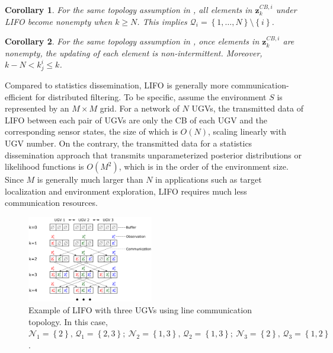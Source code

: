 \documentclass[journal]{IEEEtranTIE}
\newtheorem{cor}{\bfseries Corollary}
\theoremstyle{remark}
\begin{document}
	\begin{cor}\label{cor1}
		For the same topology assumption in , all elements in $\mathbf{z}^{CB,i}_k$ under LIFO become nonempty when $k\geq N$. 
		This implies $\mathcal{Q}_i = \left\lbrace1,\dots,N \right\rbrace \setminus \left\lbrace i\right\rbrace $.	
	\end{cor}
	
	\begin{cor}\label{cor2}
		For the same topology assumption in , once elements in $\mathbf{z}^{CB,i}_k$ are nonempty, the updating of each element is non-intermittent. Moreover, $k-N<k^i_j\leq k$.
	\end{cor}
	\medskip
	Compared to statistics dissemination, LIFO is generally more communication-efficient for distributed filtering. 
	To be specific, assume the environment $S$ is represented by an $M\times M$ grid.
	For a network of $N$ UGVs, the transmitted data of LIFO between each pair of UGVs are only the CB of each UGV and the corresponding sensor states, the size of which is $O(N)$, scaling linearly with UGV number. 
	On the contrary, the transmitted data for a statistics dissemination approach that transmits unparameterized posterior distributions or likelihood functions is $O(M^2)$, which is in the order of the environment size. 
	Since $M$ is generally much larger than $N$ in applications such as target localization and environment exploration, LIFO requires much less communication resources.
	
	\begin{figure}
		\centering
		\includegraphics[width=0.49\textwidth]{data_exchange_16-TIE-3798}
		\caption{Example of LIFO with three UGVs using line communication topology. In this case,  $\mathcal{N}_1=\left\lbrace 2 \right\rbrace,\,\mathcal{Q}_1=\left\lbrace 2,3 \right\rbrace;\: \mathcal{N}_2=\left\lbrace 1,3 \right\rbrace,\,\mathcal{Q}_2=\left\lbrace 1,3 \right\rbrace;\: \mathcal{N}_3=\left\lbrace 2 \right\rbrace,\,\mathcal{Q}_3=\left\lbrace 1,2 \right\rbrace$.}
		\label{fig:LIFO}
		\vspace{-1em}
	\end{figure}
	
\end{document}
